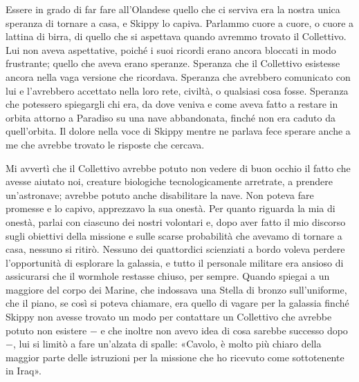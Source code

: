 Essere in grado di far fare all'Olandese quello che ci serviva era la
nostra unica speranza di tornare a casa, e Skippy lo capiva. Parlammo
cuore a cuore, o cuore a lattina di birra, di quello che si aspettava
quando avremmo trovato il Collettivo. Lui non aveva aspettative, poiché
i suoi ricordi erano ancora bloccati in modo frustrante; quello che
aveva erano speranze. Speranza che il Collettivo esistesse ancora nella
vaga versione che ricordava. Speranza che avrebbero comunicato con lui e
l'avrebbero accettato nella loro rete, civiltà, o qualsiasi cosa fosse.
Speranza che potessero spiegargli chi era, da dove veniva e come aveva
fatto a restare in orbita attorno a Paradiso su una nave abbandonata,
finché non era caduto da quell'orbita. Il dolore nella voce di Skippy
mentre ne parlava fece sperare anche a me che avrebbe trovato le
risposte che cercava.

Mi avvertì che il Collettivo avrebbe potuto non vedere di buon occhio il
fatto che avesse aiutato noi, creature biologiche tecnologicamente
arretrate, a prendere un'astronave; avrebbe potuto anche disabilitare la
nave. Non poteva fare promesse e lo capivo, apprezzavo la sua onestà.
Per quanto riguarda la mia di onestà, parlai con ciascuno dei nostri
volontari e, dopo aver fatto il mio discorso sugli obiettivi della
missione e sulle scarse probabilità che avevamo di tornare a casa,
nessuno si ritirò. Nessuno dei quattordici scienziati a bordo voleva
perdere l'opportunità di esplorare la galassia, e tutto il personale
militare era ansioso di assicurarsi che il wormhole restasse chiuso, per
sempre. Quando spiegai a un maggiore del corpo dei Marine, che indossava
una Stella di bronzo sull'uniforme, che il piano, se così si poteva
chiamare, era quello di vagare per la galassia finché Skippy non avesse
trovato un modo per contattare un Collettivo che avrebbe potuto non
esistere − e che inoltre non avevo idea di cosa sarebbe successo dopo −,
lui si limitò a fare un'alzata di spalle: «Cavolo, è molto più chiaro
della maggior parte delle istruzioni per la missione che ho ricevuto
come sottotenente in Iraq».

